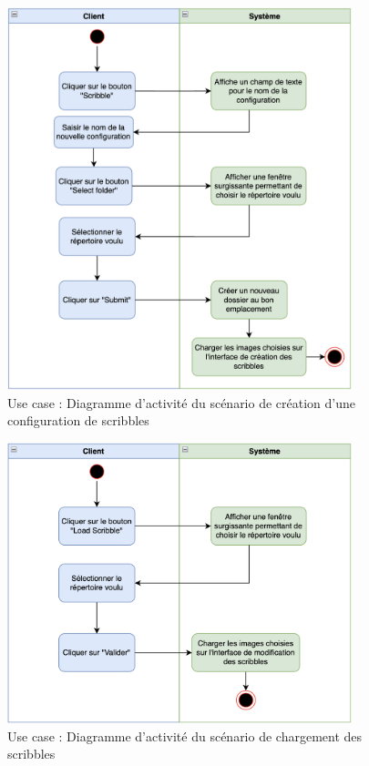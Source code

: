 \documentclass{article}
\begin{document}
\begin{figure}[htp]
    \centering
    \includegraphics[width=10cm]{scenario-new-scribbles.png}
    \caption{Use case : Diagramme d'activité du scénario de création d'une configuration de scribbles}
    \label{fig:scenario-new-scribbles}
\end{figure}

\begin{figure}[htp]
    \centering
    \includegraphics[width=10cm]{scenario-load-scribbles.png}
    \caption{Use case : Diagramme d'activité du scénario de chargement des scribbles}
    \label{fig:scenario-load-scribbbles}
\end{figure}
\end{document}
